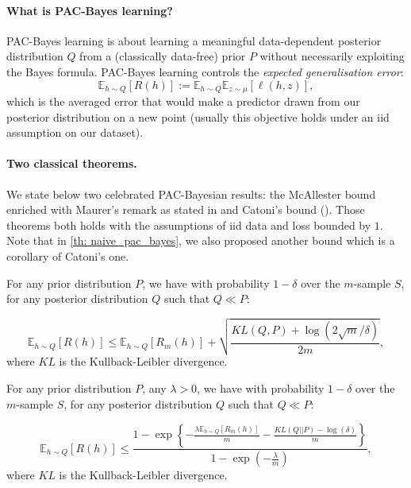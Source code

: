 \begin{noaddcontents}
\paragraph{What is PAC-Bayes learning?}
PAC-Bayes learning is about learning a meaningful data-dependent posterior distribution $Q$ from a (classically data-free) prior $P$ without necessarily exploiting the Bayes formula. PAC-Bayes learning controls the \emph{expected generalisation error}:
\[  \mathbb{E}_{h\sim Q}[R(h)] := \mathbb{E}_{h\sim Q}\mathbb{E}_{z\sim \mu} [\ell(h,z)], \]
 which is the averaged error that would make a predictor drawn from our posterior distribution on a new point (usually this objective holds under an iid assumption on our dataset).



\paragraph{Two classical theorems.} We state below two celebrated PAC-Bayesian results: the McAllester bound enriched with Maurer's remark as stated in \cite[Thm.1]{guedj2019primer} and Catoni's bound (\citealp[Thm 1.2.6]{catoni2007pac}). Those theorems both holds with the assumptions of iid data and loss bounded by $1$. Note that in \cref{th: naive_pac_bayes}, we also proposed another bound which is a corollary of Catoni's one.

\begin{theorem}
  For any prior distribution $P$, we have with probability $1-\delta$ over the $m$-sample $S$, for any posterior distribution $Q$ such that $Q\ll P$:

\[  \mathbb{E}_{h\sim Q}\left[ R(h)\right] \leq \mathbb{E}_{h\sim Q}\left[ R_m(h)\right] + \sqrt{\frac{KL(Q,P) + \log(2\sqrt{m}/\delta)}{2m}},    \]
where $KL$ is the Kullback-Leibler divergence.

\end{theorem}

\begin{theorem}
  For any prior distribution $P$, any $\lambda>0$, we have with probability $1-\delta$ over the $m$-sample $S$, for any posterior distribution $Q$ such that $Q\ll P$:

\[  \mathbb{E}_{h\sim Q}\left[ R(h)\right] \leq \frac{1-\exp \left\{-\frac{\lambda \mathbb{E}_{h\sim Q}\left[ R_m(h)\right]}{m}-\frac{KL(Q || P)-\log (\delta)}{m}\right\}}{1-\exp \left(-\frac{\lambda}{m}\right)},    \]
where $KL$ is the Kullback-Leibler divergence.


\end{theorem}
\end{noaddcontents}
